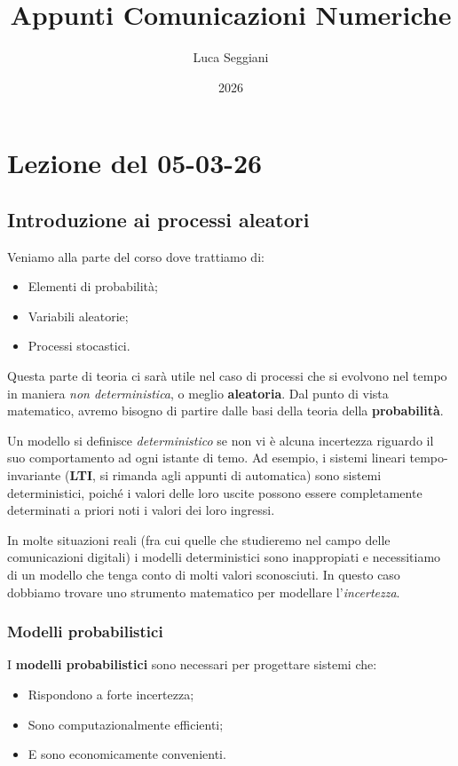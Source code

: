 \documentclass[a4paper,11pt]{article}
\title{Appunti Comunicazioni Numeriche}
\author{Luca Seggiani}
\date{2026}
\begin{document}
\section{Lezione del 05-03-26}

\thispagestyle{empty}
\pagestyle{fancy}

\subsection{Introduzione ai processi aleatori}
Veniamo alla parte del corso dove trattiamo di:
\begin{itemize}
	\item Elementi di probabilità;
	\item Variabili aleatorie;
	\item Processi stocastici.
\end{itemize}

Questa parte di teoria ci sarà utile nel caso di processi che si evolvono nel tempo in maniera \textit{non deterministica}, o meglio \textbf{aleatoria}. Dal punto di vista matematico, avremo bisogno di partire dalle basi della teoria della \textbf{probabilità}.

Un modello si definisce \textit{deterministico} se non vi è alcuna incertezza riguardo il suo comportamento ad ogni istante di temo. Ad esempio, i sistemi lineari tempo-invariante (\textbf{LTI}, si rimanda agli appunti di automatica) sono sistemi deterministici, poiché i valori delle loro uscite possono essere completamente determinati a priori noti i valori dei loro ingressi.

In molte situazioni reali (fra cui quelle che studieremo nel campo delle comunicazioni digitali) i modelli deterministici sono inappropiati e necessitiamo di un modello che tenga conto di molti valori sconosciuti. In questo caso dobbiamo trovare uno strumento matematico per modellare l'\textit{incertezza}.

\subsubsection{Modelli probabilistici}
I \textbf{modelli probabilistici} sono necessari per progettare sistemi che:
\begin{itemize}
	\item Rispondono a forte incertezza;
	\item Sono computazionalmente efficienti;
	\item E sono economicamente convenienti.
\end{itemize}
\end{document}
